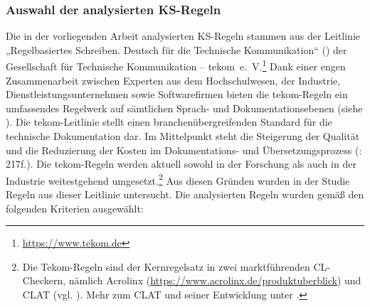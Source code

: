 \subsubsection{\label{sec:4.4.2.1}Auswahl der analysierten KS-Regeln}

Die in der vorliegenden Arbeit analysierten KS-Regeln stammen aus der Leitlinie „Regelbasiertes Schreiben. Deutsch für die Technische Kommunikation“ (\citeyear{tekom2013}) der Gesellschaft für Technische Kommunikation -- tekom~e.~V.\footnote{\url{https://www.tekom.de}} Dank einer engen Zusammenarbeit zwischen Experten aus dem Hochschulwesen, der Industrie, Dienstleistungsunternehmen sowie Softwarefirmen bieten die tekom-Re\-geln ein umfassendes Regelwerk auf sämtlichen Sprach- und Dokumentationsebenen (siehe ). Die tekom-Leitlinie stellt einen branchenübergreifenden Standard für die technische Dokumentation dar. Im Mittelpunkt steht die Steigerung der Qualität und die Reduzierung der Kosten im Dokumentations- und Übersetzungsprozess (\citealt{DrewerZiegler2014}: 217f.). Die tekom-Regeln werden aktuell sowohl in der Forschung als auch in der Industrie weitestgehend umgesetzt.\footnote{{Die Tekom-Regeln sind der Kernregelsatz in zwei marktführenden CL-Checkern, nämlich Acrolinx (\url{https://www.acrolinx.de/produktuberblick}) und CLAT (vgl. \citealt{Geldbach2009}). Mehr zum CLAT und seiner Entwicklung unter .}} Aus diesen Gründen wurden in der Studie Regeln aus dieser Leitlinie untersucht. Die analysierten Regeln wurden gemäß den folgenden Kriterien ausgewählt:

